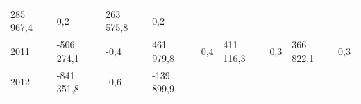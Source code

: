 \begin{longtable}[]{@{}lllllllll@{}}
\begin{minipage}[t]{0.12\columnwidth}
285 967,4\strut
\end{minipage} & \begin{minipage}[t]{0.06\columnwidth}\raggedright
0,2\strut
\end{minipage} & \begin{minipage}[t]{0.10\columnwidth}\raggedright
263 575,8\strut
\end{minipage} & \begin{minipage}[t]{0.06\columnwidth}\raggedright
0,2\strut
\end{minipage}\tabularnewline
\begin{minipage}[t]{0.05\columnwidth}\raggedright
2011\strut
\end{minipage} & \begin{minipage}[t]{0.10\columnwidth}\raggedright
-506 274,1\strut
\end{minipage} & \begin{minipage}[t]{0.06\columnwidth}\raggedright
-0,4\strut
\end{minipage} & \begin{minipage}[t]{0.16\columnwidth}\raggedright
461 979,8\strut
\end{minipage} & \begin{minipage}[t]{0.06\columnwidth}\raggedright
0,4\strut
\end{minipage} & \begin{minipage}[t]{0.12\columnwidth}\raggedright
411 116,3\strut
\end{minipage} & \begin{minipage}[t]{0.06\columnwidth}\raggedright
0,3\strut
\end{minipage} & \begin{minipage}[t]{0.10\columnwidth}\raggedright
366 822,1\strut
\end{minipage} & \begin{minipage}[t]{0.06\columnwidth}\raggedright
0,3\strut
\end{minipage}\tabularnewline
\begin{minipage}[t]{0.05\columnwidth}\raggedright
2012\strut
\end{minipage} & \begin{minipage}[t]{0.10\columnwidth}\raggedright
-841 351,8\strut
\end{minipage} & \begin{minipage}[t]{0.06\columnwidth}\raggedright
-0,6\strut
\end{minipage} & \begin{minipage}[t]{0.16\columnwidth}\raggedright
-139 899,9\strut

\end{minipage}
\end{longtable}
